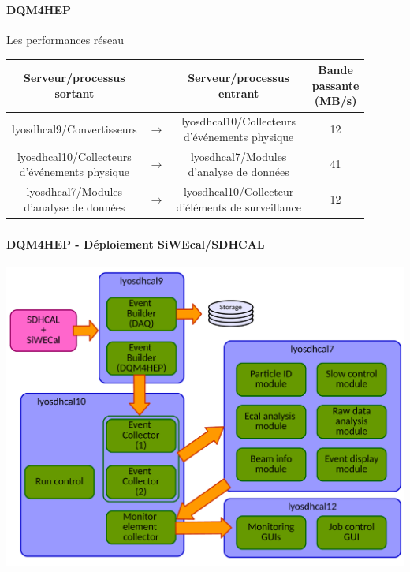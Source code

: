 \documentclass[8pt]{beamer}
\begin{document}
  \begin{frame}
  \frametitle{\secname}
  \framesubtitle{DQM4HEP}
    \begin{block}{Les performances réseau}
      \begin{table}[!h]
        \begin{center}
        \setlength\tabcolsep{10pt}
          \begin{tabular}{c c c|c}
             \makecell{Serveur/processus \\ sortant} & ~ & \makecell{Serveur/processus \\ entrant} & \makecell{Bande \\ passante \\ (MB/s)} \\
            \hline \hline
            lyosdhcal9/Convertisseurs & $\longrightarrow$ & \makecell{lyosdhcal10/Collecteurs \\ d'événements physique} & 12 \\
            \hline
            \makecell{lyosdhcal10/Collecteurs \\ d'événements physique} & $\longrightarrow$ & \makecell{lyosdhcal7/Modules \\ d'analyse de données} & 41 \\
            \hline
            \makecell{lyosdhcal7/Modules \\ d'analyse de données} & $\longrightarrow$ & \makecell{lyosdhcal10/Collecteur \\ d'éléments de surveillance} & 12
          \end{tabular}
        \end{center}
      \end{table}
    \end{block}
  \end{frame}


  \begin{frame}
  \frametitle{\secname}
  \framesubtitle{DQM4HEP - Déploiement SiWEcal/SDHCAL}
  \begin{center}
    \includegraphics[width=\linewidth]{DQMSDHCALDeployement.pdf}
  \end{center}
  \end{frame}
\end{document}
